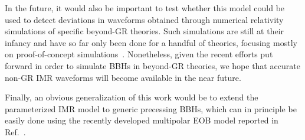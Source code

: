 In the future, it would also be important to test whether this model
could be used to detect deviations in waveforms obtained through
numerical relativity simulations of specific beyond-GR theories. Such
simulations are still at their infancy and have so far only been done
for a handful of theories, focusing mostly on proof-of-concept
simulations~\cite{Healy:2011ef,Berti:2013gfa,Cao:2013osa,Okounkova:2017yby,Hirschmann:2017psw,Witek:2018dmd,Okounkova:2019dfo,Okounkova:2019zjf,Okounkova:2020rqw,East:2020hgw}. Nonetheless,
given the recent efforts put forward in order to simulate BBHs in
beyond-GR theories, we hope that accurate non-GR IMR waveforms will
become available in the near future.

Finally, an obvious generalization of this work would be to extend the
parameterized IMR model to generic precessing BBHs, which can in
principle be easily done using the recently developed multipolar EOB
model reported in Ref.~\cite{Ossokine:2020kjp}.
